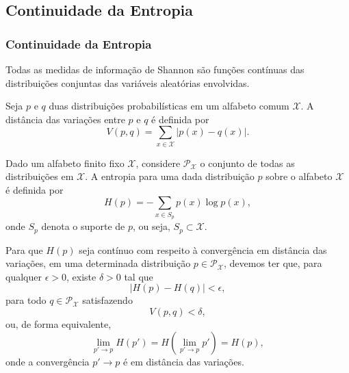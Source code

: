 \subsection{Continuidade da Entropia}
\begin{frame}[allowframebreaks]
  \frametitle{Continuidade da Entropia}

  Todas as medidas de informação de Shannon são funções contínuas das distribuições
  conjuntas das variáveis aleatórias envolvidas.

  \begin{definition}
  Seja $p$ e $q$ duas distribuições probabilísticas em um alfabeto comum $\mathcal{X}$.
  A distância das variações entre $p$ e $q$ é definida por
  \begin{equation}
  V(p,q) = \sum_{x \in \mathcal{X}} \vert p(x) - q(x) \vert .
  \end{equation}
  \end{definition} 

  Dado um alfabeto finito fixo $\mathcal{X}$, considere $\mathcal{P}_\mathcal{X}$ o
  conjunto de todas as distribuições em $\mathcal{X}$. A entropia para uma dada distribuição
  $p$ sobre o alfabeto $\mathcal{X}$ é definida por
  \begin{equation}
  H(p) = - \sum_{x \in S_p} p(x) \log p(x) ,
  \end{equation}
  onde $S_p$ denota o suporte de $p$, ou seja, $S_p \subset \mathcal{X}$.
  
  Para que $H(p)$ seja contínuo com respeito à convergência em distância das variações,
  em uma determinada distribuição $p \in \mathcal{P}_\mathcal{X}$, devemos ter que,
  para qualquer $\epsilon > 0$, existe $\delta > 0$ tal que
  \begin{equation}
  \vert H(p) - H(q) \vert < \epsilon ,
  \end{equation}
  para todo $q \in \mathcal{P}_\mathcal{X}$ satisfazendo 
  \begin{equation}
  V(p,q) < \delta ,
  \end{equation}
  ou, de forma equivalente, 
  \begin{equation}
  \lim_{p' \rightarrow p} H(p') = H\left( \lim_{p' \rightarrow p} p' \right) = H(p) ,
  \end{equation}
  onde a convergência $p' \rightarrow p$ é em distância das variações.


\end{frame}
